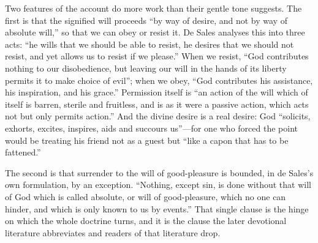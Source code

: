 Two features of the account do more work than their gentle tone suggests. The first is that the signified will proceeds ``by way of desire, and not by way of absolute will,'' so that we can obey or resist it. De Sales analyses this into three acts: ``he wills that we should be able to resist, he desires that we should not resist, and yet allows us to resist if we please.'' When we resist, ``God contributes nothing to our disobedience, but leaving our will in the hands of its liberty permits it to make choice of evil''; when we obey, ``God contributes his assistance, his inspiration, and his grace.'' Permission itself is ``an action of the will which of itself is barren, sterile and fruitless, and is as it were a passive action, which acts not but only permits action.'' And the divine desire is a real desire: God ``solicits, exhorts, excites, inspires, aids and succours us''---for one who forced the point would be treating his friend not as a guest but ``like a capon that has to be fattened.''

The second is that surrender to the will of good-pleasure is bounded, in de Sales's own formulation, by an exception. ``Nothing, except sin, is done without that will of God which is called absolute, or will of good-pleasure, which no one can hinder, and which is only known to us by events.'' That single clause is the hinge on which the whole doctrine turns, and it is the clause the later devotional literature abbreviates and readers of that literature drop.


